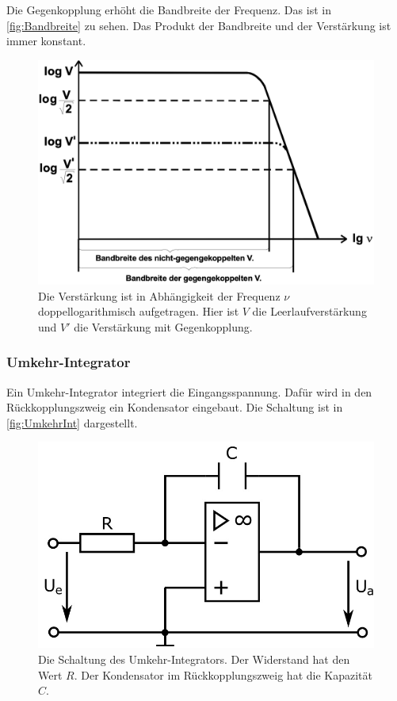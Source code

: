 Die Gegenkopplung erhöht die Bandbreite der Frequenz. Das ist in \autoref{fig:Bandbreite} zu sehen. Das Produkt der Bandbreite und der Verstärkung ist immer konstant.

\begin{figure}
    \centering
    \includegraphics[width=0.7\linewidth]{./figures/Bandbreite.png}
    \caption{Die Verstärkung ist in Abhängigkeit der Frequenz $\nu$ doppellogarithmisch aufgetragen. Hier ist $V$ die Leerlaufverstärkung und $V'$ die Verstärkung mit Gegenkopplung. \cite{V51old}}
    \label{fig:Bandbreite}
\end{figure}


\subsubsection{Umkehr-Integrator}
Ein Umkehr-Integrator integriert die Eingangsspannung.
Dafür wird in den Rückkopplungszweig ein Kondensator eingebaut. Die Schaltung ist in \autoref{fig:UmkehrInt} dargestellt.

\begin{figure}
    \centering
    \includegraphics[width=0.6\linewidth]{./figures/2_InvInt.jpeg}
    \caption{Die Schaltung des Umkehr-Integrators. Der Widerstand hat den Wert $R$. Der Kondensator im Rückkopplungszweig hat die Kapazität $C$. \cite{V51}}
    \label{fig:UmkehrInt}
\end{figure}
\FloatBarrier

